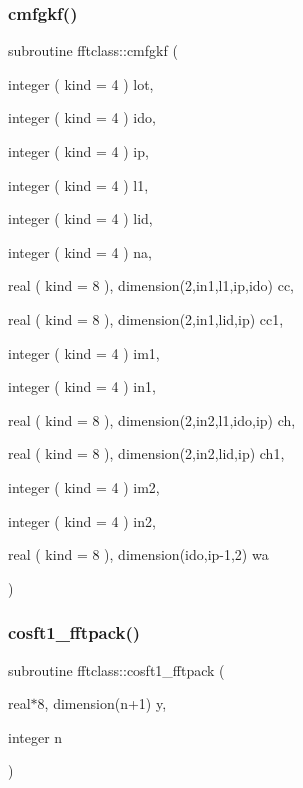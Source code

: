 \subsubsection{\texorpdfstring{cmfgkf()}{cmfgkf()}}
{\footnotesize\ttfamily subroutine fftclass\+::cmfgkf (\begin{DoxyParamCaption}\item[{integer ( kind = 4 )}]{lot,  }\item[{integer ( kind = 4 )}]{ido,  }\item[{integer ( kind = 4 )}]{ip,  }\item[{integer ( kind = 4 )}]{l1,  }\item[{integer ( kind = 4 )}]{lid,  }\item[{integer ( kind = 4 )}]{na,  }\item[{real ( kind = 8 ), dimension(2,in1,l1,ip,ido)}]{cc,  }\item[{real ( kind = 8 ), dimension(2,in1,lid,ip)}]{cc1,  }\item[{integer ( kind = 4 )}]{im1,  }\item[{integer ( kind = 4 )}]{in1,  }\item[{real ( kind = 8 ), dimension(2,in2,l1,ido,ip)}]{ch,  }\item[{real ( kind = 8 ), dimension(2,in2,lid,ip)}]{ch1,  }\item[{integer ( kind = 4 )}]{im2,  }\item[{integer ( kind = 4 )}]{in2,  }\item[{real ( kind = 8 ), dimension(ido,ip-\/1,2)}]{wa }\end{DoxyParamCaption})}

\mbox{\label{namespacefftclass_ac4347b89b0b1a5894943daa3f37c54ee}} 
\subsubsection{\texorpdfstring{cosft1\_fftpack()}{cosft1\_fftpack()}}
{\footnotesize\ttfamily subroutine fftclass\+::cosft1\+\_\+fftpack (\begin{DoxyParamCaption}\item[{real$\ast$8, dimension(n+1)}]{y,  }\item[{integer}]{n }\end{DoxyParamCaption})}

